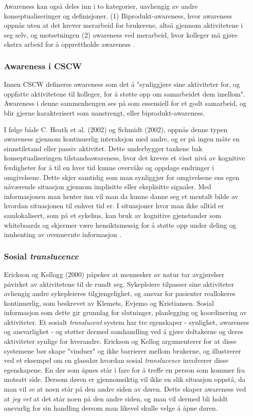\noindent
Awareness kan også deles inn i to kategorier, uavhengig av andre konseptualiseringer og definisjoner. (1) Biprodukt-awareness, hvor awareness oppnås uten at det krever merarbeid for brukerene, altså gjennom aktivitetene i seg selv, og motsetningen (2) awareness ved merarbeid, hvor kolleger må gjøre ekstra arbeid for å opprettholde awareness \cite{Randell}. 


\subsubsection{Awareness i CSCW}
Innen CSCW defineres awareness som det å "synliggjøre sine aktiviteter for, og oppfatte aktivitetene til kolleger, for å støtte opp om samarbeidet dem imellom". Awareness i denne sammenhengen ses på som essensiell for et godt samarbeid, og blir gjerne karakterisert som uanstrengt, eller biprodukt-awareness\cite{Randell}. 

\noindent
I følge både C. Heath et al. (2002) og Schmidt (2002), oppnås denne typen awareness gjennom kontinuerlig interaksjon med andre, og er på ingen måte en sinnstilstand eller passiv aktivitet. Dette underbygger tankene bak konseptualiseringen tilstandsawareness, hvor det kreves et visst nivå av kognitive ferdigheter for å til en hver tid kunne overvåke og oppdage endringer i omgivelsene. Dette skjer samtidig som man synliggjør for omgivelsene ens egen nåværende situasjon gjennom implisitte eller eksplisitte signaler. Med informasjonen man henter inn vil man da kunne danne seg et mentalt bilde av hvordan situasjonen til enhver tid er. I situasjoner hvor man ikke alltid er samlokalisert, som på et sykehus, kan bruk av kognitive gjenstander som whiteboards og skjermer være hensiktsmessig for å støtte opp under deling og innhenting av ovennevnte informasjon \cite{Bardram04}. 

\subsubsection{Sosial \emph{translucence}}
Erickson og Kellogg (2000) påpeker at mennesker av natur tar avgjørelser påvirket av aktivitetene til de rundt seg. Sykepleiere tilpasser sine aktiviteter avhengig andre sykepleieres tilgjengelighet, og ansvar for pasienter reallokeres kontinuerlig, som beskrevet av Klemets, Evjemo og Kristiansen. Sosial informasjon som dette gir grunnlag for slutninger, planlegging og koordinering av aktiviteter. 
Et sosialt \emph{translucent} system har tre egenskaper - synlighet, awareness og ansvarlighet - og støtter dermed samhandling ved å gjøre deltakerne og deres aktiviteter synlige for hverandre. Erickson og Kellog argumenterer for at disse systemene bør skape "vinduer" og ikke barrierer mellom brukerne, og illustrerer ved et eksempel om en glassdør hvordan sosial \emph{translucence} involverer disse egenskapene. 
En dør som åpnes står i fare for å treffe en person som kommer fra motsatt side. Dersom døren er gjennomsiktig vil ikke en slik situasjon oppstå, da man vil \emph{se} at noen står på den andre siden av døren. Dette skaper awareness ved at \emph{jeg vet} at det står noen på den andre siden, og man vil dermed bli holdt ansvarlig for sin handling dersom man likevel skulle velge å åpne døren.

